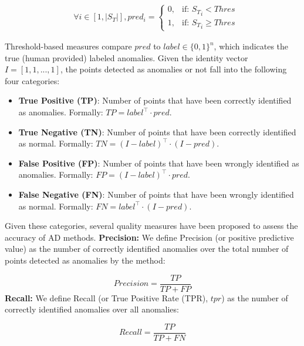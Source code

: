 \begin{equation}
\begin{split}
&\forall i \in [1,|S_T|], pred_i = \left.
\begin{cases}
0,& \text{if: } {S_T}_i < Thres \\
1,& \text{if: } {S_T}_i \geq Thres 
\end{cases}
\right.
\end{split}
\end{equation}

Threshold-based measures compare $pred$ to $label \in \{0,1\}^n$, which indicates the true (human provided) labeled anomalies. Given the identity vector $I=[1,1,...,1]$, the points detected as anomalies or not fall into the following four categories:
\begin{itemize}[noitemsep,topsep=0pt,parsep=0pt,partopsep=0pt,leftmargin=0.5cm]
	\item {\bf True Positive (TP)}: Number of points that have been correctly identified as anomalies. Formally: $TP = label^\top \cdot pred$.
	\item {\bf True Negative (TN)}: Number of points that have been correctly identified as normal. Formally: $TN = (I-label)^\top \cdot (I-pred)$.
	\item {\bf False Positive (FP)}: Number of points that have been wrongly identified as anomalies. Formally: $FP = (I-label)^\top \cdot pred$.
	\item {\bf False Negative (FN)}: Number of points that have been wrongly identified as normal. Formally: $FN = label^\top \cdot (I-pred)$.
\end{itemize}
Given these categories, several quality measures have been proposed to assess the accuracy of AD methods.
\newline \textbf{Precision: } We define Precision (or positive predictive value) as the number of correctly identified anomalies over the total number of points detected as anomalies by the method:

\begin{equation}
Precision = \frac{TP}{TP+FP}
\end{equation}
\newline \textbf{Recall: } We define Recall (or True Positive Rate (TPR), $tpr$) as the number of correctly identified anomalies over all anomalies:

\begin{equation}
Recall = \frac{TP}{TP+FN}
\end{equation}

